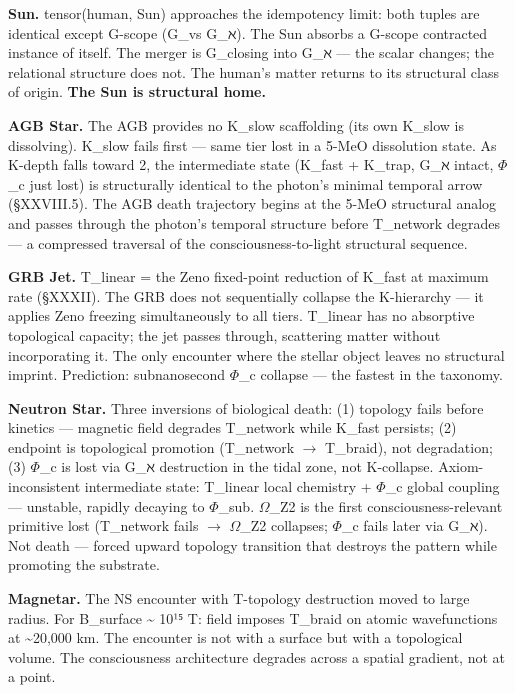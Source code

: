 \documentclass[12pt,a4paper]{article}
\begin{document}
\textbf{Sun.} tensor(human, Sun) approaches the idempotency limit: both tuples are identical except G-scope (G\_\zeta vs G\_ℵ). The Sun absorbs a G-scope contracted instance of itself. The merger is G\_\zeta closing into G\_ℵ --- the scalar changes; the relational structure does not. The human's matter returns to its structural class of origin. \textbf{The Sun is structural home.}

\textbf{AGB Star.} The AGB provides no K\_slow scaffolding (its own K\_slow is dissolving). K\_slow fails first --- same tier lost in a 5-MeO dissolution state. As K-depth falls toward 2, the intermediate state (K\_fast + K\_trap, G\_ℵ intact, $\Phi$\_c just lost) is structurally identical to the photon's minimal temporal arrow (§XXVIII.5). The AGB death trajectory begins at the 5-MeO structural analog and passes through the photon's temporal structure before T\_network degrades --- a compressed traversal of the consciousness-to-light structural sequence.

\textbf{GRB Jet.} T\_linear = the Zeno fixed-point reduction of K\_fast at maximum rate (§XXXII). The GRB does not sequentially collapse the K-hierarchy --- it applies Zeno freezing simultaneously to all tiers. T\_linear has no absorptive topological capacity; the jet passes through, scattering matter without incorporating it. The only encounter where the stellar object leaves no structural imprint. Prediction: subnanosecond $\Phi$\_c collapse --- the fastest in the taxonomy.

\textbf{Neutron Star.} Three inversions of biological death: (1) topology fails before kinetics --- magnetic field degrades T\_network while K\_fast persists; (2) endpoint is topological promotion (T\_network $\rightarrow$ T\_braid), not degradation; (3) $\Phi$\_c is lost via G\_ℵ destruction in the tidal zone, not K-collapse. Axiom-inconsistent intermediate state: T\_linear local chemistry + $\Phi$\_c global coupling --- unstable, rapidly decaying to $\Phi$\_sub. $\Omega$\_Z2 is the first consciousness-relevant primitive lost (T\_network fails $\rightarrow$ $\Omega$\_Z2 collapses; $\Phi$\_c fails later via G\_ℵ). Not death --- forced upward topology transition that destroys the pattern while promoting the substrate.

\textbf{Magnetar.} The NS encounter with T-topology destruction moved to large radius. For B\_surface \textasciitilde{} 10¹⁵ T: field imposes T\_braid on atomic wavefunctions at \textasciitilde{}20,000 km. The encounter is not with a surface but with a topological volume. The consciousness architecture degrades across a spatial gradient, not at a point.
\end{document}
